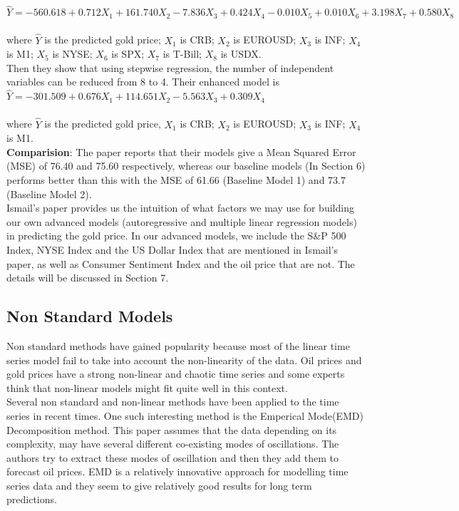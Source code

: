 \documentclass[runningheads]{llncs}
\begin{document}
$\hat{Y}=-560.618+0.712X_1+161.740X_2-7.836X_3 +0.424X_4-0.010X_5+0.010X_6+3.198X_7+0.580X_8$ \\\\
where $\hat{Y}$ is the predicted gold price; $X_1$ is CRB; $X_2$ is EUROUSD; $X_3$ is INF; $X_4$ is M1; $X_5$ is NYSE; $X_6$ is SPX; $X_7$ is T-Bill; $X_8$ is USDX.\\

\noindent Then they show that using stepwise regression, the number of independent variables can be reduced from 8 to 4. Their enhanced model is  \\

$\hat{Y}=-301.509+0.676X_1+114.651X_2-5.563X_3+0.309X_4$ \\\\
where $\hat{Y}$ is the predicted gold price, $X_1$ is CRB; $X_2$ is EUROUSD; $X_3$ is INF; $X_4$ is M1. \\

\noindent \textbf{Comparision}: The paper reports that their models give a Mean Squared Error (MSE) of 76.40 and 75.60 respectively, whereas our baseline models (In Section 6) performs better than this with the MSE of 61.66 (Baseline Model 1) and 73.7 (Baseline Model 2). \\

\noindent Ismail's paper provides us the intuition of what factors we may use for building our own advanced models (autoregressive and multiple linear regression models) in predicting the gold price. In our advanced models, we include the S\&P 500 Index, NYSE Index and the US Dollar Index that are mentioned in Ismail's paper, as well as Consumer Sentiment Index and the oil price that are not. The details will be discussed in Section 7.\\

\subsection{Non Standard Models}

\noindent Non standard methods have gained popularity because most of the linear time series model fail to take into account the non-linearity of the data. Oil prices and gold prices have a strong non-linear and chaotic time series and some experts think that non-linear models might fit quite well in this context.\\

\noindent Several non standard and non-linear methods have been applied to the time series in recent times. One such interesting method is the Emperical Mode(EMD) Decomposition method\cite{oil-zhang}. This paper assumes that the data depending on its complexity, may have several different co-existing modes of oscillations. The authors try to extract these modes of oscillation and then they add them to forecast oil prices. EMD is a relatively innovative approach for modelling time series data and they seem to give relatively good results for long term predictions.\\
\end{document}

